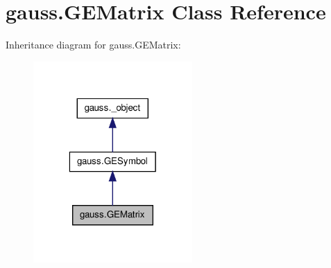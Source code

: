 \hypertarget{classgauss_1_1_g_e_matrix}{\section{gauss.\-G\-E\-Matrix Class Reference}
\label{classgauss_1_1_g_e_matrix}
}


Inheritance diagram for gauss.\-G\-E\-Matrix\-:\nopagebreak
\begin{figure}[H]
\begin{center}
\leavevmode
\includegraphics[width=172pt]{classgauss_1_1_g_e_matrix__inherit__graph}
\end{center}
\end{figure}
